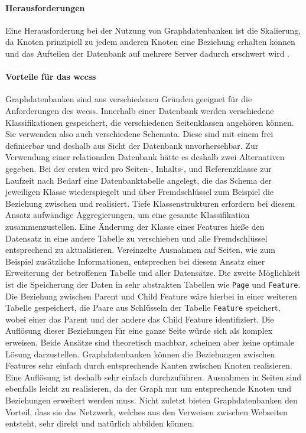     \paragraph{Herausforderungen}
    Eine Herausforderung bei der Nutzung von Graphdatenbanken ist die Skalierung,
    da Knoten prinzipiell zu jedem anderen Knoten eine Beziehung erhalten können
    und das Aufteilen der Datenbank auf mehrere Server dadurch erschwert wird
    \cite[Kapitel 11.2.5]{sadalage:nosql}.

    \paragraph{Vorteile für das \glspl{wccs}}
    Graphdatenbanken sind aus verschiedenen Gründen geeignet für die Anforderungen des \glspl{wccs}.
    Innerhalb einer Datenbank werden verschiedene Klassifikationen gespeichert,
    die verschiedenen Seitenklassen angehören können.
    Sie verwenden also auch verschiedene Schemata.
    Diese sind mit einem {\classificationModel} frei definierbar und deshalb aus Sicht der Datenbank unvorhersehbar.
    Zur Verwendung einer relationalen Datenbank hätte es deshalb zwei Alternativen gegeben.
    Bei der ersten wird pro Seiten-, Inhalts-, und Referenzklasse zur Laufzeit nach Bedarf eine Datenbanktabelle angelegt,
    die das Schema der jeweiligen Klasse wiederspiegelt und über Fremdschlüssel zum Beispiel die Beziehung
    zwischen {\parentFeature} und {\childFeature} realisiert.
    Tiefe Klassenstrukturen erfordern bei diesem Ansatz aufwändige Aggregierungen,
    um eine gesamte Klassifikation zusammenzustellen.
    Eine Änderung der Klasse eines Features hieße den Datensatz in eine andere Tabelle zu verschieben
    und alle Fremdschlüssel entsprechend zu aktualisieren.
    Vereinzelte Ausnahmen auf Seiten, wie zum Beispiel zusätzliche Informationen, entsprechen bei diesem Ansatz
    einer Erweiterung der betroffenen Tabelle und aller Datensätze.
    Die zweite Möglichkeit ist die Speicherung der Daten in sehr abstrakten Tabellen
    wie \texttt{Page} und \texttt{Feature}.
    Die Beziehung zwischen Parent und Child Feature wäre hierbei in einer weiteren Tabelle gespeichert,
    die Paare aus Schlüsseln der Tabelle \texttt{Feature} speichert, wobei einer das Parent und der andere das
    Child Feature identifiziert.
    Die Auflösung dieser Beziehungen für eine ganze Seite würde sich als komplex erweisen.
    Beide Ansätze sind theoretisch machbar, scheinen aber keine optimale Lösung darzustellen.
    Graphdatenbanken können die Beziehungen zwischen Features sehr einfach durch entsprechende Kanten zwischen Knoten realisieren.
    Eine Auflösung ist deshalb sehr einfach durchzuführen.
    Ausnahmen in Seiten sind ebenfalls leicht zu realisieren,
    da der Graph nur um entsprechende Knoten und Beziehungen erweitert werden muss.
    Nicht zuletzt bieten Graphdatenbanken den Vorteil,
    dass sie das Netzwerk, welches aus den Verweisen zwischen
    Webseiten entsteht, sehr direkt und natürlich abbilden können.
